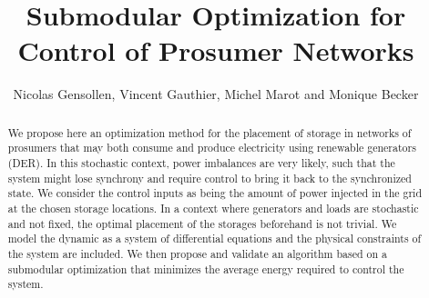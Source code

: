 \documentclass[conference]{IEEEtran}
\begin{document}
\pagestyle{plain}
\title{Submodular Optimization for Control of Prosumer Networks}


\author{Nicolas Gensollen, Vincent Gauthier, Michel Marot and Monique Becker  \\
}


\maketitle


\begin{abstract}

We propose here an optimization method for the placement of storage in networks of prosumers that may both consume and produce electricity using renewable generators (DER). In this stochastic context, power imbalances are very likely, such that the system might lose synchrony and require control to bring it back to the synchronized state. We consider the control inputs as being the amount of power injected in the grid at the chosen storage locations. In a context where generators and loads are stochastic and not fixed, the optimal placement of the storages beforehand is not trivial. We model the dynamic as a system of differential equations and the physical constraints of the system are included. We then propose and validate an algorithm based on a submodular optimization that minimizes the average energy required to control the system.

\end{abstract}
\end{document}
